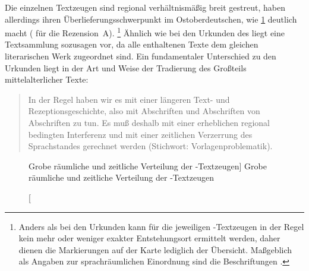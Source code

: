 Die einzelnen Textzeugen sind regional verhältnismäßig breit gestreut, haben
allerdings ihren Überlieferungsschwerpunkt im Ostoberdeutschen, wie
\cref{fig:kc_geospac_rough} deutlich macht
(\cite[vgl.~auch][]{klein1988} für die Rezension~A).%
%
	\footnote{Anders als bei den Urkunden kann für die jeweiligen
		\KC{}-Textzeugen in der Regel kein mehr oder weniger exakter
		Entstehungsort ermittelt werden, daher dienen die Markierungen auf der
		Karte lediglich der Übersicht. Maßgeblich als Angaben zur
		sprachräumlichen Einordnung sind die Beschriftungen
		\autocite[vgl.][]{wolf:kckat}.}
%
Ähnlich wie bei den Urkunden des \CAO{} liegt eine Textsammlung
sozusagen  vor, da alle enthaltenen Texte dem gleichen
literarischen Werk zugeordnet sind. Ein fundamentaler Unterschied zu den
Urkunden liegt in der Art und Weise der Tradierung des Großteils
mittelalterlicher Texte: \blockquote[{\cites[1310]{wegera2000}[siehe
auch][262--263]{fleischer2019}}]{In der Regel haben wir es mit einer längeren
Text- und Rezeptionsgeschichte, also mit Abschriften und Abschriften von
Abschriften zu tun. Es muß deshalb mit einer erheblichen regional bedingten
Interferenz und mit einer zeitlichen Verzerrung des Sprachstandes gerechnet
werden (Stichwort: Vorlagenproblematik).}

\begin{figure}
\centering
{}
\caption%
	[Grobe räumliche und zeitliche Verteilung der \KC{}-Textzeugen]%
	{Grobe räumliche und zeitliche Verteilung der \KC{}-Textzeugen
		\nocite{wiesinger1983:rede}
	}
	\label{fig:kc_geospac_rough}
\end{figure}

